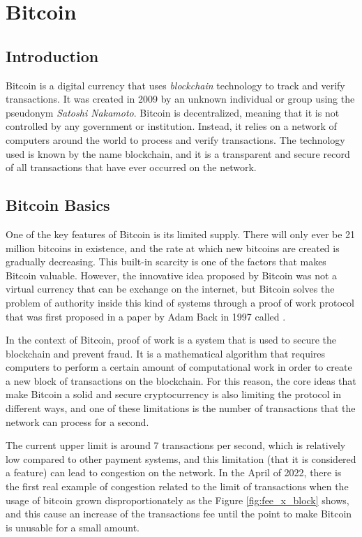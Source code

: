 \setcounter{page}{1}
\chapter{Bitcoin}

\section{Introduction}

Bitcoin is a digital currency that uses \emph{blockchain} technology to track
and verify transactions. It was created in 2009 by an unknown individual or
group using the pseudonym \emph{Satoshi Nakamoto}.
Bitcoin is decentralized, meaning that it is not controlled by any government
or institution. Instead, it relies on a network of computers around the world
to process and verify transactions.
The technology used is known by the name blockchain, and it is a transparent
and secure record of all transactions that have
ever occurred on the network.

\section{Bitcoin Basics}
\label{sec:basics}

One of the key features of Bitcoin is its limited supply. There will only ever
be 21 million bitcoins in existence, and the rate at which new bitcoins are
created is gradually decreasing. This built-in scarcity is one of the factors
that makes Bitcoin valuable.
However, the innovative idea proposed by Bitcoin was not a virtual currency that can be
exchange on the internet, but Bitcoin solves the problem of authority inside this kind
of systems through a proof of work protocol that was first proposed in a paper
by Adam Back in 1997 called .

In the context of Bitcoin, proof of work is a system that is used to secure the
blockchain and prevent fraud. It is a mathematical algorithm that requires computers
to perform a certain amount of computational work in order to create a new
block of transactions on the blockchain.
For this reason, the core ideas that make Bitcoin a solid and secure cryptocurrency 
is also limiting the protocol in different ways, and one of these limitations is the number of
transactions that the network can process for a second.

The current upper limit is around 7 transactions per second, 
which is relatively low compared to other payment systems, and 
this limitation (that it is considered a feature) can lead to congestion
on the network. 
In the April of 2022, there is the first real example of congestion 
related to the limit of transactions when the usage of bitcoin
grown disproportionately as the Figure \ref{fig:fee_x_block} shows, and this
cause an increase of the transactions fee until the point to make 
Bitcoin is unusable for a small amount.

